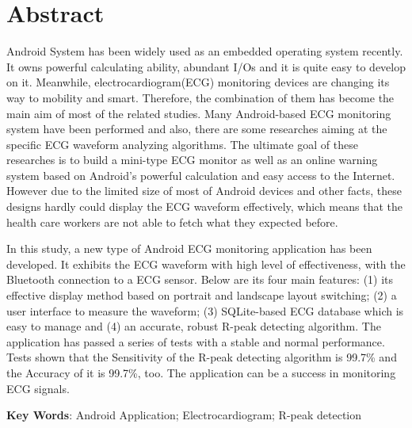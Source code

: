 \section*{\xiaoerhao \Rom Abstract}
\xiaosihao
\Rom
Android System has been widely used as an embedded operating system recently. It owns powerful calculating ability, abundant I/Os and it is quite easy to develop on it. Meanwhile, electrocardiogram(ECG) monitoring devices are changing its way to mobility and smart. Therefore, the combination of them has become the main aim of most of the related studies. Many Android-based ECG monitoring system have been performed and also, there are some researches aiming at the specific ECG waveform analyzing algorithms. The ultimate goal of these researches is to build a mini-type ECG monitor as well as an online warning system based on Android's powerful calculation and easy access to the Internet. However due to the limited size of most of Android devices and other facts, these designs hardly could display the ECG waveform effectively, which means that the health care workers are not able to fetch what they expected before. 

In this study, a new type of Android ECG monitoring application has been developed. It exhibits the ECG waveform with high level of effectiveness, with the Bluetooth connection to a ECG sensor. Below are its four main features: (1) its effective display method based on portrait and landscape layout switching; (2) a user interface to measure the waveform; (3) SQLite-based ECG database which is easy to manage and (4) an accurate, robust R-peak detecting algorithm. The application has passed a series of tests with a stable and normal performance. Tests shown that the Sensitivity of the R-peak detecting algorithm is 99.7\% and the Accuracy of it is 99.7\%, too. The application can be a success in monitoring ECG signals. 


\noindent
\textbf{\sihao Key Words}:
Android Application; Electrocardiogram; R-peak detection
\indent 